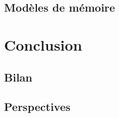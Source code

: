 \subsection{Modèles de mémoire}











 
 
\section{Conclusion}
 
\subsection{Bilan}

 
\subsection{Perspectives}





\endinput

